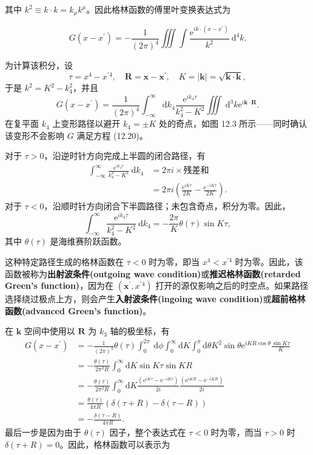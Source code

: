 其中
$k^{2} \equiv k \cdot k = k_{\mu} k^{\mu}$。因此格林函数的傅里叶变换表达式为

\begin{equation}\label{eq:12.21} 
 G\left(x-x^{\prime}\right)=-\frac{1}{(2 \pi)^{4}} \iiint \int \frac{\mathrm{e}^{i k \cdot\left(x-x^{\prime}\right)}}{k^{2}} \mathrm{~d}^{4} k. 
 \end{equation}

为计算该积分，设
 $$
\tau=x^{4}-x^{\prime 4}, \quad \mathbf{R}=\mathbf{x}-\mathbf{x}^{\prime}, \quad K=|\mathbf{k}|=\sqrt{\mathbf{k} \cdot \mathbf{k}},
$$
于是 $k^{2}=K^{2}-k_{4}^{2}$，并且
 $$
G\left(x-x^{\prime}\right)=\frac{1}{(2 \pi)^{4}} \int_{-\infty}^{\infty} \mathrm{d} k_{4} \frac{\mathrm{e}^{i k_{4} \tau}}{k_{4}^{2}-K^{2}} \iiint \mathrm{~d}^{3} k \mathrm{e}^{i \mathbf{k} \cdot \mathbf{R}}.
$$
在复平面 $k_{4}$ 上变形路径以避开 $k_{4}=\pm K$ 处的奇点，如图 12.3
所示------同时确认该变形不会影响 $G$ 满足方程 (12.20)。

对于 $\tau>0$，沿逆时针方向完成上半圆的闭合路径，有
 $$
\begin{aligned}
\int_{-\infty}^{\infty} \frac{\mathrm{e}^{i k_{4} \tau}}{k_{4}^{2}-K^{2}} \mathrm{~d} k_{4} & =2 \pi i \times \text{残差和} \\
& =2 \pi i\left(\frac{\mathrm{e}^{i K \tau}}{2 K}-\frac{\mathrm{e}^{-i K \tau}}{2 K}\right).
\end{aligned}
$$
对于
$\tau<0$，沿顺时针方向闭合下半圆路径；未包含奇点，积分为零。因此，
 $$
\int_{-\infty}^{\infty} \frac{\mathrm{e}^{i k_{4} \tau}}{k_{4}^{2}-K^{2}} \mathrm{~d} k_{4}=-\frac{2 \pi}{K} \theta(\tau) \sin K \tau,
$$
其中 $\theta(\tau)$ 是海维赛阶跃函数。

这种特定路径生成的格林函数在 $\tau<0$ 时为零，即当
$x^{4}<x^{\prime 4}$
时为零。因此，该函数被称为\textbf{出射波条件(outgoing wave condition)}或\textbf{推迟格林函数(retarded Green's function)}，因为在
$\left(\mathbf{x}^{\prime}, x^{\prime 4}\right)$
打开的源仅影响之后的时空点。如果路径选择绕过极点上方，则会产生\textbf{入射波条件(ingoing wave condition)}或\textbf{超前格林函数(advanced Green's
function)}。

在 $\mathbf{k}$ 空间中使用以 $\mathbf{R}$ 为 $k_{3}$
轴的极坐标，有
 $$
\begin{aligned}
G\left(x-x^{\prime}\right) & =-\frac{1}{(2 \pi)^{3}} \theta(\tau) \int_{0}^{2 \pi} \mathrm{~d} \phi \int_{0}^{\infty} \mathrm{d} K \int_{0}^{\pi} \mathrm{d} \theta K^{2} \sin \theta \mathrm{e}^{i K R \cos \theta} \frac{\sin K \tau}{K} \\
& =-\frac{\theta(\tau)}{2 \pi^{2} R} \int_{0}^{\infty} \mathrm{d} K \sin K \tau \sin K R \\
& =-\frac{\theta(\tau)}{2 \pi^{2} R} \int_{0}^{\infty} \mathrm{d} K \frac{\left(\mathrm{e}^{i K \tau}-\mathrm{e}^{-i K \tau}\right)}{2 i} \frac{\left(\mathrm{e}^{i K R}-\mathrm{e}^{-i K R}\right)}{2 i} \\
& =\frac{\theta(\tau)}{4 \pi R}(\delta(\tau+R)-\delta(\tau-R)) \\
& =-\frac{\delta(\tau-R)}{4 \pi R}.
\end{aligned}
$$
最后一步是因为由于 $\theta(\tau)$ 因子，整个表达式在 $\tau<0$
时为零，而当 $\tau>0$ 时
$\delta(\tau+R)=0$。因此，格林函数可以表示为

